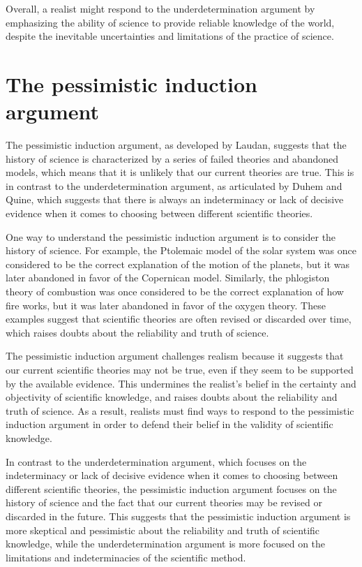 \documentclass[12pt]{article}
\begin{document}
	Overall, a realist might respond to the underdetermination argument by emphasizing the ability of science to provide reliable knowledge of the world, despite the inevitable uncertainties and limitations of the practice of science.

	\section*{The pessimistic induction argument}
	The pessimistic induction argument, as developed by Laudan, suggests that the history of science is characterized by a series of failed theories and abandoned models, which means that it is unlikely that our current theories are true. This is in contrast to the underdetermination argument, as articulated by Duhem and Quine, which suggests that there is always an indeterminacy or lack of decisive evidence when it comes to choosing between different scientific theories.

	One way to understand the pessimistic induction argument is to consider the history of science. For example, the Ptolemaic model of the solar system was once considered to be the correct explanation of the motion of the planets, but it was later abandoned in favor of the Copernican model. Similarly, the phlogiston theory of combustion was once considered to be the correct explanation of how fire works, but it was later abandoned in favor of the oxygen theory. These examples suggest that scientific theories are often revised or discarded over time, which raises doubts about the reliability and truth of science.

	The pessimistic induction argument challenges realism because it suggests that our current scientific theories may not be true, even if they seem to be supported by the available evidence. This undermines the realist's belief in the certainty and objectivity of scientific knowledge, and raises doubts about the reliability and truth of science. As a result, realists must find ways to respond to the pessimistic induction argument in order to defend their belief in the validity of scientific knowledge.

	In contrast to the underdetermination argument, which focuses on the indeterminacy or lack of decisive evidence when it comes to choosing between different scientific theories, the pessimistic induction argument focuses on the history of science and the fact that our current theories may be revised or discarded in the future. This suggests that the pessimistic induction argument is more skeptical and pessimistic about the reliability and truth of scientific knowledge, while the underdetermination argument is more focused on the limitations and indeterminacies of the scientific method.
\end{document}
